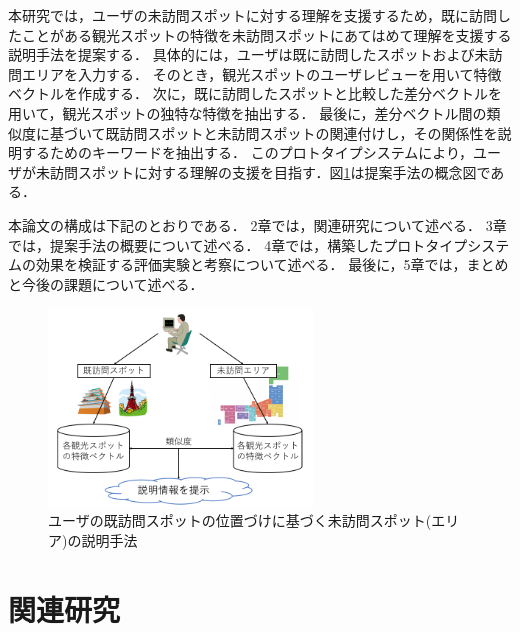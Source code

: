 \documentclass{deimj}
\begin{document}
本研究では，ユーザの未訪問スポットに対する理解を支援するため，既に訪問したことがある観光スポットの特徴を未訪問スポットにあてはめて理解を支援する説明手法を提案する．
具体的には，ユーザは既に訪問したスポットおよび未訪問エリアを入力する．
そのとき，観光スポットのユーザレビューを用いて特徴ベクトルを作成する．
次に，既に訪問したスポットと比較した差分ベクトルを用いて，観光スポットの独特な特徴を抽出する．
最後に，差分ベクトル間の類似度に基づいて既訪問スポットと未訪問スポットの関連付けし，その関係性を説明するためのキーワードを抽出する．
このプロトタイプシステムにより，ユーザが未訪問スポットに対する理解の支援を目指す．図\ref{fig:Photo_Image}は提案手法の概念図である．

本論文の構成は下記のとおりである．
2章では，関連研究について述べる．
3章では，提案手法の概要について述べる．
4章では，構築したプロトタイプシステムの効果を検証する評価実験と考察について述べる．
最後に，5章では，まとめと今後の課題について述べる．

\begin{figure}[t]
  \begin{center}
    \includegraphics[clip,width=7.0cm]{picture/Photo_Image_jap.png}
    \caption{ユーザの既訪問スポットの位置づけに基づく未訪問スポット(エリア)の説明手法}
    \label{fig:Photo_Image}
   \end{center}
\end{figure}


\section{関連研究}
\label{sec:関連研究}
\end{document}
